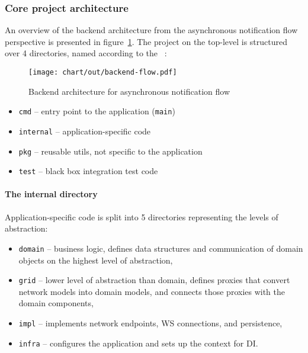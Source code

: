 \subsubsection{Core project architecture}\label{sec:core-project-architecture}

An overview of the backend architecture
from the asynchronous notification flow perspective
is presented in figure~\ref{fig:high-level-backend-flow}.
The project on the top-level is structured over 4 directories,
named according to
the ~\cite{quest_standard_2022}:

\begin{figure}[h]
  \centering
  \texttt{[image: chart/out/backend-flow.pdf]}
  \caption{Backend architecture for asynchronous notification flow}
  \label{fig:high-level-backend-flow}
\end{figure}

\begin{itemize}
  \item
        \texttt{cmd} -- entry point to the application (\texttt{main})
  \item
        \texttt{internal} -- application-specific code
  \item
        \texttt{pkg} -- reusable utils, not specific to the application
  \item
        \texttt{test} -- black box integration test code
\end{itemize}

\paragraph{The internal directory}\label{sec:the-internal-directory}

Application-specific code is split into 5 directories
representing the levels of abstraction:

\begin{itemize}
  \item
        \texttt{domain} -- business logic,
        defines data structures and communication of domain objects
        on the highest level of abstraction,
  \item
        \texttt{grid} -- lower level of abstraction than domain,
        defines proxies that convert network models into domain models,
        and connects those proxies with the domain components,
  \item
        \texttt{impl} -- implements network endpoints,
        \ac{WS} connections, and persistence,
  \item
        \texttt{infra} -- configures the application
        and sets up the context for \ac{DI}.
\end{itemize}

